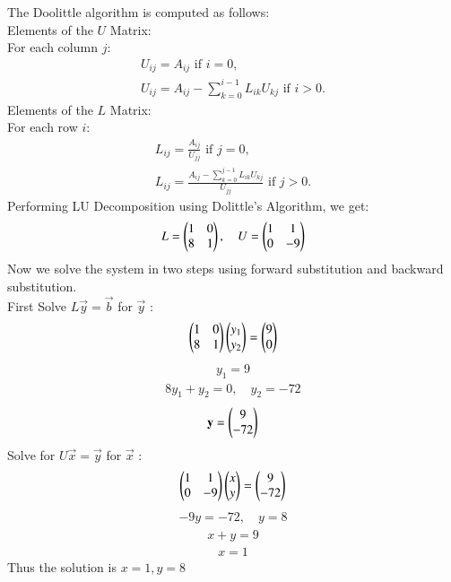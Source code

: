 \documentclass[journal]{IEEEtran}
\numberwithin{equation}{enumi}
\numberwithin{figure}{enumi}
\begin{document}
The Doolittle algorithm is computed as follows:\\
Elements of the $U$ Matrix: \\  
For each column $j $:
\begin{align}
	U_{ij} = A_{ij} \text{ if } i = 0,\\
	U_{ij} = A_{ij} - \sum_{k=0}^{i-1} L_{ik} U_{kj} \text{ if } i > 0.
\end{align}
Elements of the $L$ Matrix:\\  
For each row $i $:  
\begin{align}
	L_{ij} = \frac{A_{ij}}{U_{jj}} \text{ if } j = 0, \\  
	L_{ij} = \frac{A_{ij} - \sum_{k=0}^{j-1} L_{ik} U_{kj}}{U_{jj}} \text{ if } j > 0.  
\end{align}
Performing LU Decomposition using Dolittle's Algorithm, we get:
\begin{align}
	L = \begin{pmatrix}1 & 0\\
	8 & 1\end{pmatrix}, \quad U = \begin{pmatrix}1 & 1\\
	0 & -9\end{pmatrix}
\end{align}
Now we solve the system in two steps using forward substitution and backward substitution.\\
First Solve $L\vec{y} = \vec{b}$ for $\vec{y}$ :
\begin{align}
	\begin{pmatrix}1 & 0\\8 & 1\end{pmatrix}\begin{pmatrix}y_1\\y_2\end{pmatrix} = \begin{pmatrix}9\\0\end{pmatrix}
\end{align}
\begin{align}
	y_1 = 9
\end{align}
\begin{align}
	8y_1 + y_2 = 0, \quad y_2 = -72
\end{align}
\begin{align}
	\mathbf{y} =  \begin{pmatrix}9\\-72\end{pmatrix}
\end{align}
Solve for $U\vec{x} = \vec{y}$ for $\vec{x}$ :
\begin{align}
	\begin{pmatrix}1 & 1\\0 & -9\end{pmatrix}\begin{pmatrix}x\\y\end{pmatrix} = \begin{pmatrix}9\\-72\end{pmatrix}
\end{align}
\begin{align}
        -9y = -72, \quad y = 8
\end{align}
\begin{align}
	x + y = 9
\end{align}
\begin{align}
	x = 1
\end{align}
Thus the solution is $x = 1, y = 8$
\end{document}
